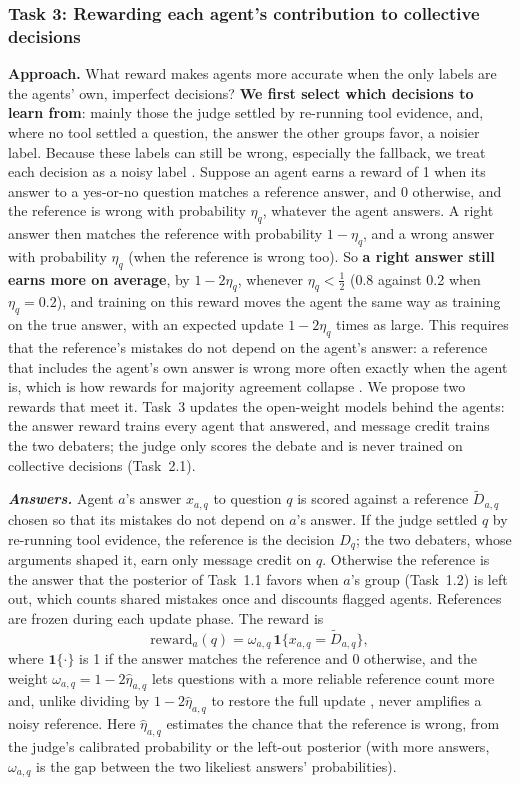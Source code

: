 \documentclass[12pt,letterpaper]{article}
\newcommand{\hd}[1]{\ifhmode\par\fi\addvspace{1pt}\noindent\textbf{#1}\hspace{0.35em}}
\newcommand{\slab}[1]{\textbf{\textit{#1}}}
\begin{document}
\subsubsection{Task 3: Rewarding each agent's contribution to collective decisions}\label{sec:t3}
\hd{Approach.} What reward makes agents more accurate when the only labels are the agents' own, imperfect decisions? \textbf{We first select which decisions to learn from}: mainly those the judge settled by re-running tool evidence, and, where no tool settled a question, the answer the other groups favor, a noisier label. Because these labels can still be wrong, especially the fallback, we treat each decision as a noisy label \citep{natarajan2013noisy}. Suppose an agent earns a reward of 1 when its answer to a yes-or-no question matches a reference answer, and 0 otherwise, and the reference is wrong with probability $\eta_q$, whatever the agent answers. A right answer then matches the reference with probability $1-\eta_q$, and a wrong answer with probability $\eta_q$ (when the reference is wrong too). So \textbf{a right answer still earns more on average}, by $1-2\eta_q$, whenever $\eta_q<\frac12$ (0.8 against 0.2 when $\eta_q=0.2$), and training on this reward moves the agent the same way as training on the true answer, with an expected update $1-2\eta_q$ times as large. This requires that the reference's mistakes do not depend on the agent's answer: a reference that includes the agent's own answer is wrong more often exactly when the agent is, which is how rewards for majority agreement collapse \citep{shafayat2025selftrain}. We propose two rewards that meet it. Task~3 updates the open-weight models behind the agents: the answer reward trains every agent that answered, and message credit trains the two debaters; the judge only scores the debate and is never trained on collective decisions (Task~2.1).

\slab{Answers.} Agent $a$'s answer $x_{a,q}$ to question $q$ is scored against a reference $\tilde D_{a,q}$ chosen so that its mistakes do not depend on $a$'s answer. If the judge settled $q$ by re-running tool evidence, the reference is the decision $D_q$; the two debaters, whose arguments shaped it, earn only message credit on $q$. Otherwise the reference is the answer that the posterior of Task~1.1 favors when $a$'s group (Task~1.2) is left out, which counts shared mistakes once and discounts flagged agents. References are frozen during each update phase. The reward is
\begin{equation}
\mathrm{reward}_a(q)=\omega_{a,q}\,\mathbf{1}\{x_{a,q}=\tilde D_{a,q}\},
\label{eq:firstanswer}
\end{equation}
where $\mathbf{1}\{\cdot\}$ is 1 if the answer matches the reference and 0 otherwise, and the weight $\omega_{a,q}=1-2\hat\eta_{a,q}$ lets questions with a more reliable reference count more and, unlike dividing by $1-2\hat\eta_{a,q}$ to restore the full update \citep{natarajan2013noisy}, never amplifies a noisy reference. Here $\hat\eta_{a,q}$ estimates the chance that the reference is wrong, from the judge's calibrated probability or the left-out posterior (with more answers, $\omega_{a,q}$ is the gap between the two likeliest answers' probabilities).
\end{document}
